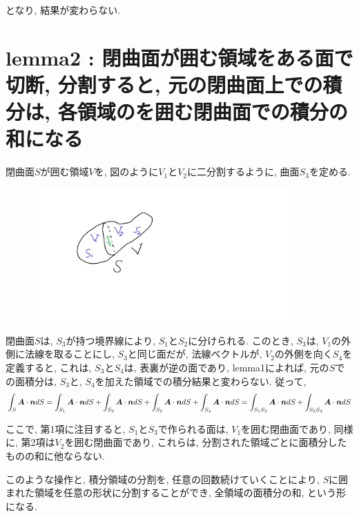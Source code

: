 \documentclass{jsarticle}
\newcommand*{\mbold}[1]{\mbox{\boldmath $#1$}}
\begin{document}
となり, 結果が変わらない. 

\section{lemma2 : 閉曲面が囲む領域をある面で切断, 分割すると, 元の閉曲面上での積分は, 各領域のを囲む閉曲面での積分の和になる}
閉曲面$S$が囲む領域$V$を, 図のように$V_1$と$V_2$に二分割するように, 曲面$S_3$を定める. 
\begin{figure}[htbp]
  \begin{center}
    \includegraphics[width=10cm]{Figure/ClosedSurface.png}
  \end{center}
\end{figure}

閉曲面$S$は, $S_3$が持つ境界線により, $S_1$と$S_2$に分けられる. このとき, $S_3$は, $V_1$の外側に法線を取ることにし, $S_3$と同じ面だが, 法線ベクトルが, $V_2$の外側を向く$S_4$を定義すると, これは, $S_3$と$S_4$は, 表裏が逆の面であり, lemma1によれば, 元の$S$での面積分は, $S_3$と, $S_4$を加えた領域での積分結果と変わらない. 
従って, 
\begin{equation}
  \int_S \mbold{A}\cdot \mbold{n} dS
  = \int_{S_1} \mbold{A}\cdot \mbold{n} dS 
  + \int_{S_3} \mbold{A}\cdot \mbold{n} dS 
  + \int_{S_2} \mbold{A}\cdot \mbold{n} dS
  + \int_{S_4} \mbold{A}\cdot \mbold{n} dS
  = \int_{S_1 S_3} \mbold{A}\cdot \mbold{n} dS + \int_{S_2 S_4} \mbold{A}\cdot \mbold{n} dS
\end{equation}

ここで, 第1項に注目すると, $S_1$と$S_3$で作られる面は, $V_1$を囲む閉曲面であり, 同様に, 第2項は$V_2$を囲む閉曲面であり, これらは, 分割された領域ごとに面積分したものの和に他ならない. 

このような操作と, 積分領域の分割を, 任意の回数続けていくことにより, $S$に囲まれた領域を任意の形状に分割することができ, 
全領域の面積分の和, という形になる. 
\end{document}
